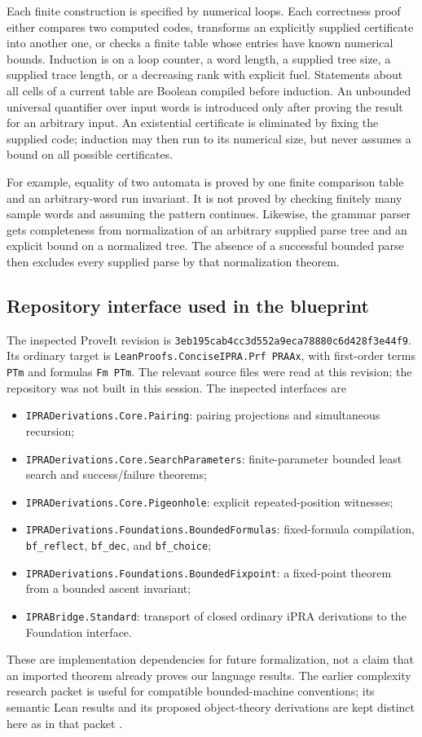Each finite construction is specified by numerical loops. Each correctness
proof either compares two computed codes, transforms an explicitly supplied
certificate into another one, or checks a finite table whose entries have
known numerical bounds. Induction is on a loop counter, a word length,
a supplied tree size, a supplied trace length, or a decreasing rank with
explicit fuel. Statements about all cells of a current table are Boolean
compiled before induction. An unbounded universal quantifier over input
words is introduced only after proving the result for an arbitrary input.
An existential certificate is eliminated by fixing the supplied code;
induction may then run to its numerical size, but never assumes a bound
on all possible certificates.

For example, equality of two automata is proved by one finite comparison
table and an arbitrary-word run invariant. It is not proved by checking
finitely many sample words and assuming the pattern continues. Likewise,
the grammar parser gets completeness from normalization of an arbitrary
supplied parse tree and an explicit bound on a normalized tree. The absence
of a successful bounded parse then excludes every supplied parse by that
normalization theorem.

\subsection{Repository interface used in the blueprint}

The inspected ProveIt revision is
\texttt{3eb195cab4cc3d552a9eca78880c6d428f3e44f9}.
Its ordinary target is \texttt{LeanProofs.ConciseIPRA.Prf PRAAx}, with
first-order terms \texttt{PTm} and formulas \texttt{Fm PTm}.
The relevant source files were read at this revision; the repository was
not built in this session. The inspected interfaces are
\begin{itemize}
\item \texttt{IPRADerivations.Core.Pairing}: pairing projections and
simultaneous recursion;
\item \texttt{IPRADerivations.Core.SearchParameters}: finite-parameter
bounded least search and success/failure theorems;
\item \texttt{IPRADerivations.Core.Pigeonhole}: explicit repeated-position
witnesses;
\item \texttt{IPRADerivations.Foundations.BoundedFormulas}: fixed-formula
compilation, \texttt{bf\_reflect}, \texttt{bf\_dec}, and
\texttt{bf\_choice};
\item \texttt{IPRADerivations.Foundations.BoundedFixpoint}: a fixed-point
theorem from a bounded ascent invariant;
\item \texttt{IPRABridge.Standard}: transport of closed ordinary iPRA
derivations to the Foundation interface.
\end{itemize}
These are implementation dependencies for future formalization, not a
claim that an imported theorem already proves our language results. The
earlier complexity research packet is useful for compatible bounded-machine
conventions; its semantic Lean results and its proposed object-theory
derivations are kept distinct here as in that packet
\cite{ProveIt,ProveItComplexity}.
